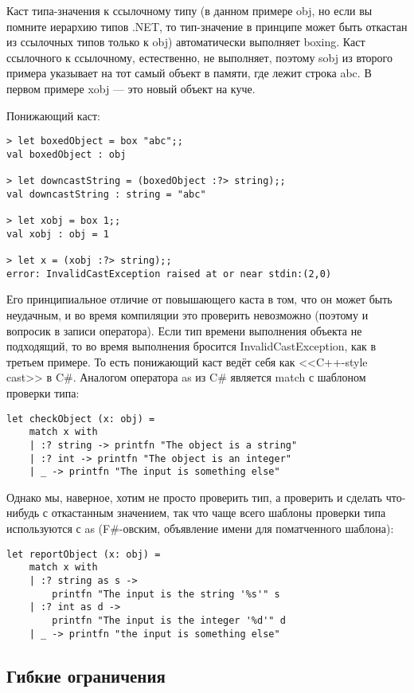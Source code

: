 \documentclass[a5paper]{article}
\begin{document}
Каст типа-значения к ссылочному типу (в данном примере obj, но если вы помните иерархию типов  .NET, то тип-значение в принципе может быть откастан из ссылочных типов только к obj) автоматически выполняет boxing. Каст ссылочного к ссылочному, естественно, не выполняет, поэтому sobj из второго примера указывает на тот самый объект в памяти, где лежит строка abc. В первом примере xobj --- это новый объект на куче.

Понижающий каст:

\begin{verbatim}
> let boxedObject = box "abc";;
val boxedObject : obj

> let downcastString = (boxedObject :?> string);;
val downcastString : string = "abc"

> let xobj = box 1;;
val xobj : obj = 1

> let x = (xobj :?> string);;
error: InvalidCastException raised at or near stdin:(2,0)
\end{verbatim}

Его принципиальное отличие от повышающего каста в том, что он может быть неудачным, и во время компиляции это проверить невозможно (поэтому и вопросик в записи оператора). Если тип времени выполнения объекта не подходящий, то во время выполнения бросится InvalidCastException, как в третьем примере. То есть понижающий каст ведёт себя как <<C++-style cast>> в C\#. Аналогом оператора as из C\# является match с шаблоном проверки типа:

\begin{verbatim}
let checkObject (x: obj) =
    match x with
    | :? string -> printfn "The object is a string"
    | :? int -> printfn "The object is an integer"
    | _ -> printfn "The input is something else"
\end{verbatim}

Однако мы, наверное, хотим не просто проверить тип, а проверить и сделать что-нибудь с откастанным значением, так что чаще всего шаблоны проверки типа используются с as (F\#-овским, объявление имени для поматченного шаблона):

\begin{verbatim}
let reportObject (x: obj) =
    match x with
    | :? string as s -> 
        printfn "The input is the string '%s'" s
    | :? int as d -> 
        printfn "The input is the integer '%d'" d
    | _ -> printfn "the input is something else"
\end{verbatim}

\subsection{Гибкие ограничения}
\end{document}
